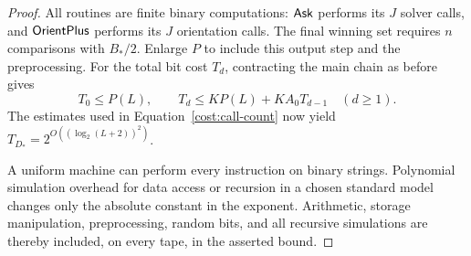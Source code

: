 \begin{proof}
All routines are finite binary computations: \(\mathsf{Ask}\) performs its
\(J\) solver calls, and \(\mathsf{OrientPlus}\) performs its \(J\)
orientation calls. The final winning set requires \(n\) comparisons
with \(B_*/2\). Enlarge \(P\) to include this output step and the
preprocessing. For the total bit cost \(T_d\), contracting the main
chain as before gives
\begin{equation}\label{cost:bit-recurrence}
 T_0\le P(L),\qquad
 T_d\le KP(L)+KA_0T_{d-1}\quad(d\ge1).
\end{equation}
The estimates used in Equation~\eqref{cost:call-count} now yield
\(T_{D_*}=2^{O((\log_2(L+2))^2)}\).

A uniform machine can perform every instruction on binary strings.
Polynomial simulation overhead for data access or recursion in a
chosen standard model changes only the absolute constant in the
exponent. Arithmetic, storage manipulation, preprocessing, random
bits, and all recursive simulations are thereby included, on every
tape, in the asserted bound.
\end{proof}
